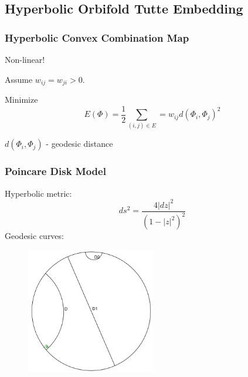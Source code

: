 \documentclass{beamer}
\begin{document}

\subsection{Hyperbolic Orbifold Tutte Embedding}

\begin{frame}
\frametitle{Hyperbolic Convex Combination Map}
Non-linear! 

Assume $w_{ij} = w_{ji} > 0$.

Minimize $$ E(\Phi) = \frac{1}{2}\sum_{(i,j)\in E} = w_{ij}d(\Phi_i,\Phi_j)^2$$

$d(\Phi_i,\Phi_j)$ - geodesic distance
\end{frame}

\begin{frame}
\frametitle{Poincare Disk Model}
Hyperbolic metric:
$$ ds^2 = \frac{4|dz|^2}{(1 - |z|^2)^2}$$
Geodesic curves:
\begin{figure}
\includegraphics[width=0.5\textwidth]{images/geodesic}
\end{figure}
\end{frame}
\end{document}
